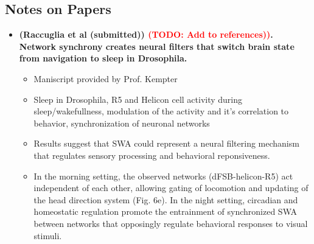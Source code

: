 \documentclass[../workflow.tex]{subfiles}
\begin{document}
\newpage
\subsection{Notes on Papers}
\begin{itemize}
    \item \textbf{(Raccuglia et al (submitted)) \textcolor{red}{(TODO: Add to references))}. Network
    synchrony creates neural filters that switch brain state from navigation to sleep in Drosophila.}

    \begin{itemize}
        \item Maniscript provided by Prof. Kempter
        
        \item Sleep in Drosophila, R5 and Helicon cell activity during sleep/wakefullness, modulation
        of the activity and it's correlation to behavior, synchronization of neuronal networks
        
        \item Results suggest that SWA could represent a neural filtering mechanism that regulates sensory processing
        and behavioral reponsiveness.

        \item In the morning setting, the observed networks (dFSB-helicon-R5) act independent of each
        other, allowing gating of locomotion and updating of the head direction system (Fig. 6e). In
        the night setting, circadian and homeostatic regulation promote the entrainment of
        synchronized SWA between networks that opposingly regulate behavioral responses to visual
        stimuli.

    \end{itemize}
\end{itemize}

\begin{center}
    
    
    
\end{center}



\end{document}
